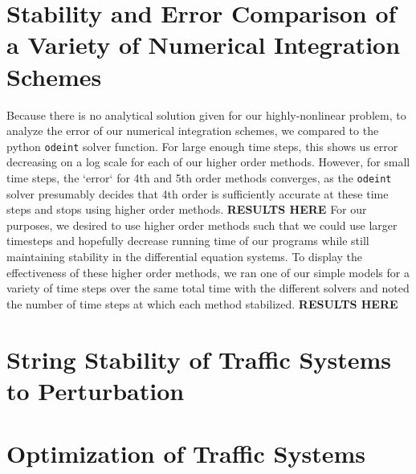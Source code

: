\documentclass[11pt]{article}
\begin{document}
\section{Stability and Error Comparison of a Variety of Numerical Integration Schemes}
Because there is no analytical solution given for our highly-nonlinear problem, to analyze the error of our numerical integration schemes, we compared to the python \texttt{odeint} solver function. For large enough time steps, this shows us error decreasing on a log scale for each of our higher order methods. However, for small time steps, the `error` for 4th and 5th order methods converges, as the \texttt{odeint} solver presumably decides that 4th order is sufficiently accurate at these time steps and stops using higher order methods.
\textbf{RESULTS HERE}
For our purposes, we desired to use higher order methods such that we could use larger timesteps and hopefully decrease running time of our programs while still maintaining stability in the differential equation systems. To display the effectiveness of these higher order methods, we ran one of our simple models for a variety of time steps over the same total time with the different solvers and noted the number of time steps at which each method stabilized.
\textbf{RESULTS HERE}

\section{String Stability of Traffic Systems to Perturbation}


\section{Optimization of Traffic Systems}
\end{document}
